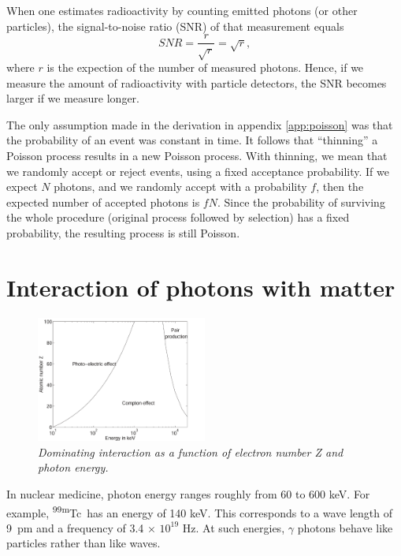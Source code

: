 \documentclass[11pt,oneside]{article}
\begin{document}
When one estimates radioactivity by counting emitted photons (or other
particles), the signal-to-noise ratio (SNR) of that measurement equals
\begin{equation}
 SNR = \frac{r}{\sqrt{r}} = \sqrt{r},
\end{equation}
where $r$ is the expection of the number of measured photons.  Hence,
if we measure the amount of radioactivity with particle detectors, the
SNR becomes larger if we measure longer.

The only assumption made in the derivation in appendix
\ref{app:poisson} was that the probability of an event was constant in
time. It follows that ``thinning'' a Poisson process results in a new
Poisson process. With thinning, we mean that we randomly accept or
reject events, using a fixed acceptance probability. If we expect $N$
photons, and we randomly accept with a probability $f$, then the
expected number of accepted photons is $fN$. Since the probability of
surviving the whole procedure (original process followed by selection)
has a fixed probability, the resulting process is still Poisson.

\section{Interaction of photons with matter}

\begin{figure}[tb]
\centering
\includegraphics[width = 0.5\textwidth]{figs/fig_foto_compton_pair.pdf}
\caption{\label{fig:foto_compton_pair} \emph{Dominating interaction as a
function of electron number Z and photon energy.}}
\end{figure}

In nuclear medicine, photon energy ranges roughly from 60 to 600 keV. For
example, \textsuperscript{99m}Tc\ has an energy of 140 keV. This corresponds to a wave
length of 9~pm and a frequency of 3.4 $\times$ $10^{19}$ Hz. At such energies,
$\gamma$ photons behave like particles rather than like waves.
\end{document}
